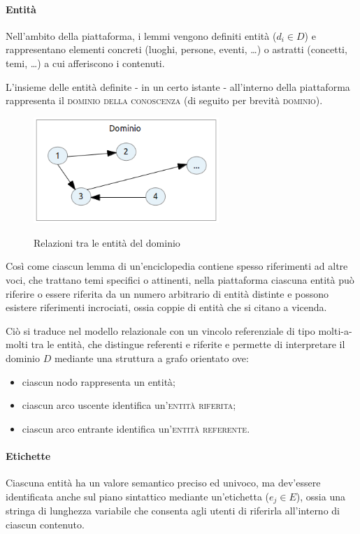 \paragraph{Entità}
Nell'ambito della piattaforma, i lemmi vengono definiti entità ($d_i \in D$) e rappresentano elementi concreti (luoghi, persone, eventi, \ldots) o astratti (concetti, temi, \ldots) a cui afferiscono i contenuti.

L'insieme delle entità definite - in un certo istante - all'interno della piattaforma rappresenta il \textsc{dominio della conoscenza} (di seguito per brevità \textsc{dominio}).

\begin{figure}[ht]
	\begin{center}
		\includegraphics[width=7cm]{img/relazioni-entita.png}
		\label{fig:tesi:stage:fase-uno:entita-relazioni}
		\caption{Relazioni tra le entità del dominio}
	\end{center}
\end{figure}

Così come ciascun lemma di un'enciclopedia contiene spesso riferimenti ad altre voci, che trattano temi specifici o attinenti, nella piattaforma ciascuna entità può riferire o essere riferita da un numero arbitrario di entità distinte e possono esistere riferimenti incrociati, ossia coppie di entità che si citano a vicenda.

Ciò si traduce nel modello relazionale con un vincolo referenziale di tipo molti-a-molti tra le entità, che distingue referenti e riferite e permette di interpretare il dominio $D$ mediante una struttura a grafo orientato ove:
\begin{itemize}
\item ciascun nodo rappresenta un entità;
\item ciascun arco uscente identifica un'\textsc{entità riferita};
\item ciascun arco entrante identifica un'\textsc{entità referente}.
\end{itemize}

\paragraph{Etichette}
Ciascuna entità ha un valore semantico preciso ed univoco, ma dev'essere identificata anche sul piano sintattico mediante un'etichetta ($e_j \in E$), ossia una stringa di lunghezza variabile che consenta agli utenti di riferirla all'interno di ciascun contenuto.

